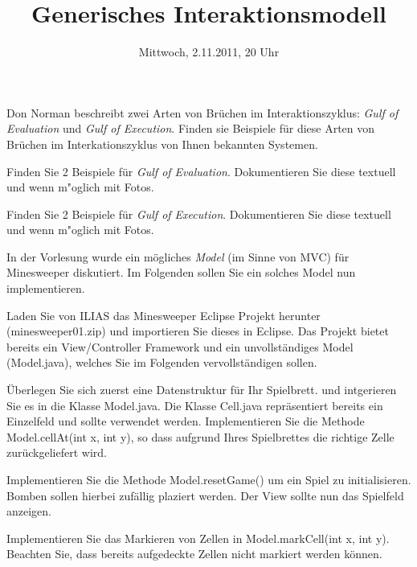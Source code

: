 \documentclass{article}
\title{Generisches Interaktionsmodell}
\date{Mittwoch, 2.11.2011, 20 Uhr} %
\begin{document}
 	\maketitle

	Don Norman beschreibt zwei Arten von Br\"uchen im Interaktionszyklus: \emph{Gulf of Evaluation} und \emph{Gulf of Execution}. Finden sie Beispiele f\"ur diese Arten von Br\"uchen im Interkationszyklus von Ihnen bekannten Systemen. 
	
	\begin{subtask}
		Finden Sie 2 Beispiele f\"ur \emph{Gulf of Evaluation}. Dokumentieren Sie diese textuell und wenn m"oglich mit Fotos.
	\end{subtask}
	
	\begin{subtask}
		Finden Sie 2 Beispiele f\"ur \emph{Gulf of Execution}. Dokumentieren Sie diese textuell und wenn m"oglich mit Fotos.
	\end{subtask}
	

In der Vorlesung wurde ein mögliches \emph{Model} (im Sinne von MVC) für Minesweeper diskutiert. Im Folgenden sollen Sie ein solches Model nun implementieren.

\begin{subtask}
	Laden Sie von ILIAS das Minesweeper Eclipse Projekt herunter (minesweeper01.zip) und importieren Sie dieses in Eclipse. Das Projekt bietet bereits ein View/Controller Framework und ein unvollständiges Model (Model.java), welches Sie im Folgenden vervollständigen sollen.
\end{subtask}

\begin{subtask}
Überlegen Sie sich zuerst eine Datenstruktur für Ihr Spielbrett. und intgerieren Sie es in die Klasse Model.java. Die Klasse Cell.java repräsentiert bereits ein Einzelfeld und sollte verwendet werden. Implementieren Sie die Methode Model.cellAt(int x, int y), so dass aufgrund Ihres Spielbrettes die richtige Zelle zurückgeliefert wird.
\end{subtask}

\begin{subtask}
	Implementieren Sie die Methode Model.resetGame() um ein Spiel zu initialisieren. Bomben sollen hierbei zufällig plaziert werden. Der View sollte nun das Spielfeld anzeigen.
\end{subtask}

\begin{subtask}
	Implementieren Sie das Markieren von Zellen in Model.markCell(int x, int y). Beachten Sie, dass bereits aufgedeckte Zellen nicht markiert werden können.
\end{subtask}
\end{document}
